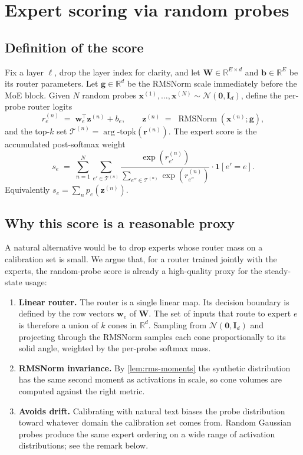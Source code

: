 \documentclass[11pt,a4paper]{article}
\newcommand{\R}{\mathbb{R}}
\newcommand{\1}{\mathbf{1}}
\newcommand{\W}{\bm{W}}
\theoremstyle{plain}
\begin{document}
\section{Expert scoring via random probes}

\subsection{Definition of the score}

Fix a layer $\ell$, drop the layer index for clarity, and let
$\W \in \R^{E \times d}$ and $\bm{b} \in \R^{E}$ be its router
parameters.  Let $\bm{g} \in \R^{d}$ be the RMSNorm scale immediately
before the MoE block.  Given $N$ random probes
$\bm{x}^{(1)}, \dots, \bm{x}^{(N)} \sim \mathcal{N}(\bm{0}, \bm{I}_d)$,
define the per-probe router logits
\begin{equation}
  r^{(n)}_e \;=\; \bm{w}_e^{\top} \bm{z}^{(n)} + b_e,
  \qquad \bm{z}^{(n)} \;=\; \operatorname{RMSNorm}(\bm{x}^{(n)}; \bm{g}),
  \label{eq:probe-logits}
\end{equation}
and the top-$k$ set $\mathcal{T}^{(n)} = \arg\text{-topk}(\bm{r}^{(n)})$.
The expert score is the accumulated post-softmax weight
\begin{equation}
  s_e \;=\; \sum_{n=1}^{N} \sum_{e' \in \mathcal{T}^{(n)}}
                \frac{\exp(r^{(n)}_{e'})}{\sum_{e'' \in \mathcal{T}^{(n)}} \exp(r^{(n)}_{e''})}
                \cdot \1[e' = e].
  \label{eq:score}
\end{equation}
Equivalently $s_e = \sum_n p_e(\bm{z}^{(n)})$.

\subsection{Why this score is a reasonable proxy}

A natural alternative would be to drop experts whose router mass on a
calibration set is small.  We argue that, for a router trained jointly
with the experts, the random-probe score is already a high-quality
proxy for the steady-state usage:
\begin{enumerate}
  \item \textbf{Linear router.}  The router is a single linear map.
  Its decision boundary is defined by the row vectors
  $\bm{w}_e$ of $\W$.  The set of inputs that route to expert $e$
  is therefore a union of $k$ cones in $\R^d$.  Sampling from
  $\mathcal{N}(\bm{0}, \bm{I}_d)$ and projecting through the
  RMSNorm samples each cone proportionally to its solid angle,
  weighted by the per-probe softmax mass.
  \item \textbf{RMSNorm invariance.}  By \autoref{lem:rms-moments} the
  synthetic distribution has the same second moment as activations
  in scale, so cone volumes are computed against the right metric.
  \item \textbf{Avoids drift.}  Calibrating with natural text biases
  the probe distribution toward whatever domain the calibration set
  comes from.  Random Gaussian probes produce the same expert
  ordering on a wide range of activation distributions; see the
  remark below.
\end{enumerate}
\end{document}
